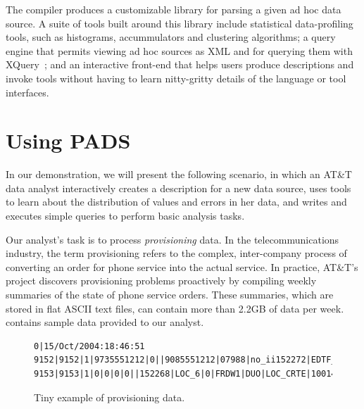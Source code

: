 The \pads{} compiler produces a customizable library for
parsing a given ad hoc data source.  A suite of tools built around
this library include statistical data-profiling tools, such as
histograms, accummulators and clustering algorithms; a query engine
that permits viewing ad hoc sources as XML and for querying them with
XQuery~\cite{fernandez+:padx}; and an interactive front-end that helps
users produce \pads{} descriptions and invoke tools without having to
learn nitty-gritty details of the \pads{} language or tool interfaces.

\section{Using PADS}
\label{subsec:example}

In our demonstration, we will present the following scenario,
in which an AT\&T data analyst interactively creates a
\pads{} description for a new data source, uses \pads{} tools to learn
about the distribution of values and errors in her data, and writes
and executes simple queries to perform basic analysis tasks.  

Our analyst's task is to process \textit{provisioning} data.  In the
telecommunications industry, the term {provisioning} refers to
the complex, inter-company process of converting an order for phone
service into the actual service.  In practice, AT\&T's \dibbler{}
project discovers provisioning problems proactively by compiling
weekly summaries of the state of phone service
orders.  These summaries, which are stored in flat ASCII text files,
can contain more than 2.2GB of data per
week.  contains sample data
provided to our analyst.
\begin{figure}
\begin{small}
\begin{center}
\begin{verbatim}
0|15/Oct/2004:18:46:51
9152|9152|1|9735551212|0||9085551212|07988|no_ii152272|EDTF_6|0|APRL1|DUO|10|16/Oct/2004:10:02:10
9153|9153|1|0|0|0|0||152268|LOC_6|0|FRDW1|DUO|LOC_CRTE|1001476800|LOC_OS_10|17/Oct/2004:08:14:21
\end{verbatim}
\caption{Tiny example of \dibbler{} provisioning data.}
\label{figure:dibbler-records}
\end{center}
\end{small}
\end{figure}

